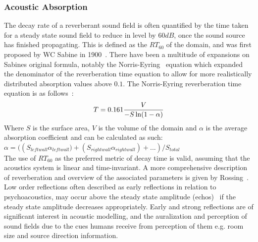 \subsubsection{Acoustic Absorption}
The decay rate of a reverberant sound field is often quantified by the time taken for a steady state sound field to reduce in level by $60{dB}$, once the sound source has finished propagating. This is defined as the $RT_{60}$ of the domain, and was first proposed by WC Sabine in 1900~\cite{Everest2009}. There have been a multitude of expansions on Sabines original formula, notably the Norris-Eyring~\cite{Beranek2006} equation which expanded the denominator of the reverberation time equation to allow for more realistically distributed absorption values above $0.1$. The Norris-Eyring reverberation time equation is as follows~\cite{Davis2014}:\\
\begin{equation}
T = 0.161\frac{V}{-S \ln(1 - \alpha)}\\
\end{equation}
Where $S$ is the surface area, $V$ is the volume of the domain and $\alpha$ is the average absorption coefficient and can be calculated as such:\\
$\alpha = (\left( S_{leftwall} \alpha_{leftwall})+(S_{rightwall} \alpha_{rightwall})+... \right) /S_{total}$ \\

The use of $RT_{60}$ as the preferred metric of decay time is valid, assuming that the acoustics system is linear and time-invariant.
A more comprehensive description of reverberation and overview of the associated parameters is given by Rossing~\cite{Rossing2007}. \\

Low order reflections often described as early reflections in relation to psychoacoustics, may occur above the steady state amplitude (echos)~\cite{Everest2009} if the steady state amplitude decreases appropriately. Early and strong reflections are of significant interest in acoustic modelling, and the auralization and perception of sound fields due to the cues humans receive from perception of them e.g. room size and source direction information.\\

